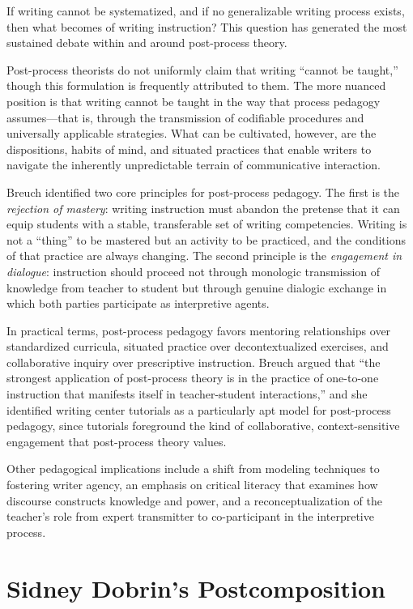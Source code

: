 \documentclass[12pt]{article}
\begin{document}
If writing cannot be systematized, and if no generalizable writing process exists, then what becomes of writing instruction? This question has generated the most sustained debate within and around post-process theory.

Post-process theorists do not uniformly claim that writing ``cannot be taught,'' though this formulation is frequently attributed to them. The more nuanced position is that writing cannot be taught in the way that process pedagogy assumes---that is, through the transmission of codifiable procedures and universally applicable strategies. What can be cultivated, however, are the dispositions, habits of mind, and situated practices that enable writers to navigate the inherently unpredictable terrain of communicative interaction.

Breuch identified two core principles for post-process pedagogy. The first is the \textit{rejection of mastery}: writing instruction must abandon the pretense that it can equip students with a stable, transferable set of writing competencies. Writing is not a ``thing'' to be mastered but an activity to be practiced, and the conditions of that practice are always changing. The second principle is the \textit{engagement in dialogue}: instruction should proceed not through monologic transmission of knowledge from teacher to student but through genuine dialogic exchange in which both parties participate as interpretive agents.

In practical terms, post-process pedagogy favors mentoring relationships over standardized curricula, situated practice over decontextualized exercises, and collaborative inquiry over prescriptive instruction. Breuch argued that ``the strongest application of post-process theory is in the practice of one-to-one instruction that manifests itself in teacher-student interactions,'' and she identified writing center tutorials as a particularly apt model for post-process pedagogy, since tutorials foreground the kind of collaborative, context-sensitive engagement that post-process theory values.

Other pedagogical implications include a shift from modeling techniques to fostering writer agency, an emphasis on critical literacy that examines how discourse constructs knowledge and power, and a reconceptualization of the teacher's role from expert transmitter to co-participant in the interpretive process.

\section{Sidney Dobrin's Postcomposition}
\end{document}
